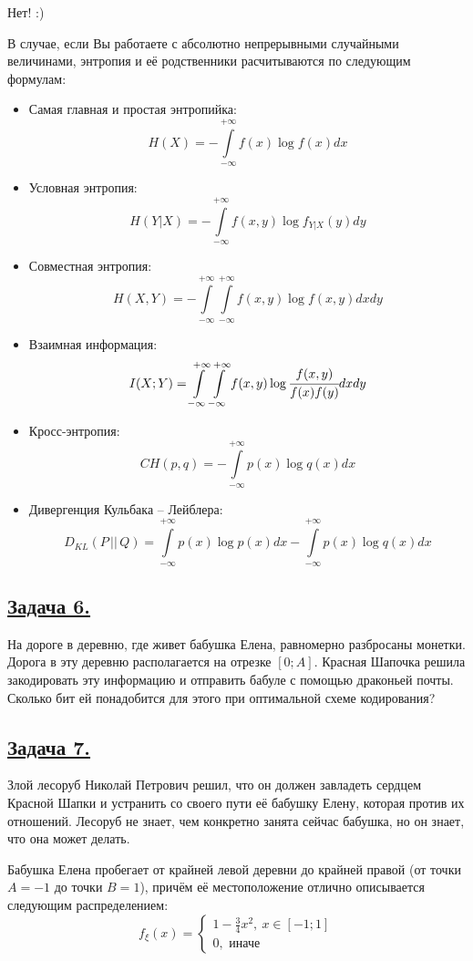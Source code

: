Нет! :)

В случае, если Вы работаете с абсолютно непрерывными случайными величинами, энтропия и её родственники расчитываются по следующим формулам:
\begin{itemize}
    \item Самая главная и простая энтропийка:
    \[H(X)=-\int\limits_{-\infty}^{+\infty} f(x)\log f(x)dx \]
    \item Условная энтропия:
    \[H(Y|X)=-\int\limits_{-\infty}^{+\infty} f(x, y)\log f_{Y|X}(y)dy \]
    \item Совместная энтропия:
    \[H(X, Y)=-\int\limits_{-\infty}^{+\infty} \int\limits_{-\infty}^{+\infty} f(x, y)\log f(x, y)dxdy \]
    \item Взаимная информация:
    \[I(X; Y)=\int\limits_{-\infty}^{+\infty} \int\limits_{-\infty}^{+\infty} f(x, y) \log \cfrac{f(x, y)}{f(x)f(y)}dxdy \]
    \item Кросс-энтропия:
    \[CH(p, q)=-\int\limits_{-\infty}^{+\infty}p(x)\log q(x) dx \]
    \item Дивергенция Кульбака -- Лейблера:
    \[D_{KL}(P\, ||\, Q)=\int\limits_{-\infty}^{+\infty} p(x)\log p(x)dx -\int\limits_{-\infty}^{+\infty} p(x)\log q(x)dx  \]
\end{itemize}

\subsection*{\hyperref[sec:sol_problem6]{Задача 6.}}\label{sec:problem6} На дороге в деревню, где живет бабушка Елена, равномерно разбросаны монетки. Дорога в эту деревню располагается на отрезке $[0; A]$. Красная Шапочка решила закодировать эту информацию и отправить бабуле с помощью драконьей почты. Сколько бит ей понадобится для этого при оптимальной схеме кодирования?

\subsection*{\hyperref[sec:sol_problem7]{Задача 7.}}\label{sec:problem7} Злой лесоруб Николай Петрович решил, что он должен завладеть сердцем Красной Шапки и устранить со своего пути её бабушку Елену, которая против их отношений. Лесоруб не знает, чем конкретно занята сейчас бабушка, но он знает, что она может делать.

Бабушка Елена пробегает от крайней левой деревни до крайней правой (от точки $A=-1$ до точки $B=1$), причём её местоположение отлично описывается следующим распределением:\[f_{\xi}(x)=\begin{cases}
    1-\frac{3}{4}x^2, \ x\in [-1; 1] \\
    0, \text{ иначе}
\end{cases} \]

